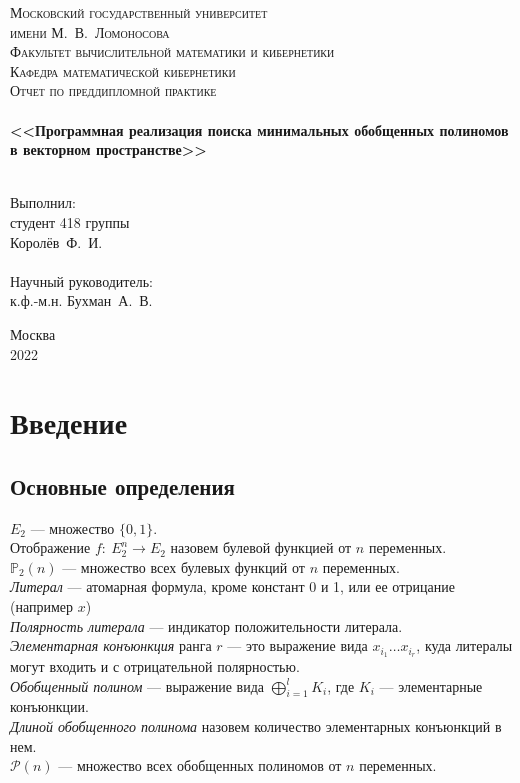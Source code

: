\documentclass[a4paper,12pt,titlepage,finall]{article}
\begin{document}
\begin{titlepage}
    \begin{center}
    \textsc{\small Московский государственный университет \\имени М.~В.~Ломоносова\\
    Факультет вычислительной математики и кибернетики\\Кафедра математической кибернетики\\}
    \vfill
    \textsc{\Large Отчет по преддипломной практике}\\
    ~\\
    \textbf{\large <<Программная реализация поиска минимальных обобщенных полиномов в векторном пространстве>>}\\
    ~\\
    \end{center}
    \begin{flushright}
    \vfill {Выполнил:\\
    студент 418 группы\\
    Королёв~Ф.~И.\\
    ~\\
    Научный руководитель:\\
    к.ф.-м.н. Бухман~А.~В.}
    \end{flushright}
    \begin{center}
    \vfill
    {\small Москва\\2022}
    \end{center}
\end{titlepage}

\tableofcontents
\newpage

\section{Введение}

\subsection{Основные определения}

$ E_2 $ --- множество $ \{ 0, 1 \} $.\\
Отображение $ f:\ E_2^n \rightarrow E_2 $ назовем булевой функцией от $ n $ переменных.\\
$ \mathbb{P}_2(n) $ --- множество всех булевых функций от $ n $ переменных.\\
\textit{Литерал} --- атомарная формула, кроме констант 0 и 1, или ее отрицание (например $ x $)\\
\textit{Полярность литерала} --- индикатор положительности литерала.\\
\textit{Элементарная конъюнкция} ранга $ r $ --- это выражение вида $ x_{i_1} \dots x_{i_r} $, куда литералы могут входить и с отрицательной полярностью.\\
\textit{Обобщенный полином} --- выражение вида $ \bigoplus\limits_{i = 1}^l K_i $, где $ K_i $ --- элементарные конъюнкции.\\
\textit{Длиной обобщенного полинома} назовем количество элементарных конъюнкций в нем.\\
$ \mathcal{P}(n) $ --- множество всех обобщенных полиномов от $ n $ переменных.
\end{document}
